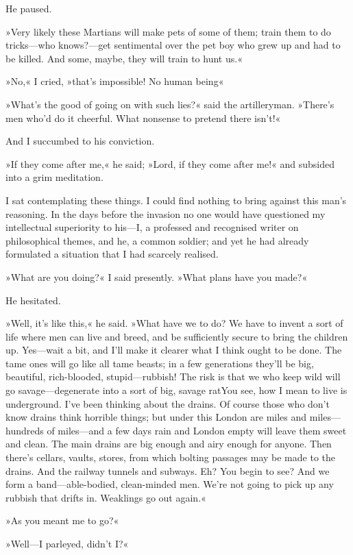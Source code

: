He paused.

»Very likely these Martians will make pets of some of them; train them to do tricks—who knows?—get sentimental over the pet boy who grew up and had to be killed. And some, maybe, they will train to hunt us.«

»No,« I cried, »that's impossible! No human being\longdash«

»What's the good of going on with such lies?« said the artilleryman. »There's men who'd do it cheerful. What nonsense to pretend there isn't!«

And I succumbed to his conviction.

»If they come after me,« he said; »Lord, if they come after me!« and subsided into a grim meditation.

I sat contemplating these things. I could find nothing to bring against this man's reasoning. In the days before the invasion no one would have questioned my intellectual superiority to his—I, a professed and recognised writer on philosophical themes, and he, a common soldier; and yet he had already formulated a situation that I had scarcely realised.

»What are you doing?« I said presently. »What plans have you made?«

He hesitated.

»Well, it's like this,« he said. »What have we to do? We have to invent a sort of life where men can live and breed, and be sufficiently secure to bring the children up. Yes—wait a bit, and I'll make it clearer what I think ought to be done. The tame ones will go like all tame beasts; in a few generations they'll be big, beautiful, rich-blooded, stupid—rubbish! The risk is that we who keep wild will go savage—degenerate into a sort of big, savage rat\textellipsis You see, how I mean to live is underground. I've been thinking about the drains. Of course those who don't know drains think horrible things; but under this London are miles and miles—hundreds of miles—and a few days rain and London empty will leave them sweet and clean. The main drains are big enough and airy enough for anyone. Then there's cellars, vaults, stores, from which bolting passages may be made to the drains. And the railway tunnels and subways. Eh? You begin to see? And we form a band—able-bodied, clean-minded men. We're not going to pick up any rubbish that drifts in. Weaklings go out again.«

»As you meant me to go?«

»Well—I parleyed, didn't I\@?«


